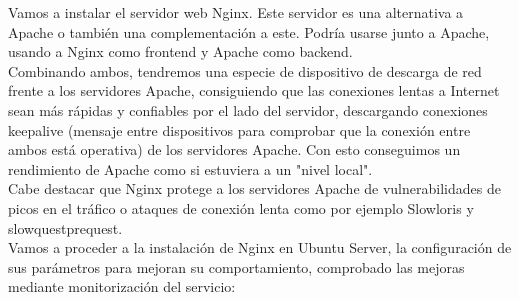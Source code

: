	
	Vamos a instalar el servidor web Nginx. Este servidor es una alternativa a Apache o también una complementación a este. Podría usarse junto a Apache, usando a Nginx como frontend y Apache como backend.\cite{ejercicio6-1,ejercicio6-2} \\
	Combinando ambos, tendremos una especie de dispositivo de descarga de red frente a los servidores Apache, consiguiendo que las conexiones lentas a Internet sean más rápidas y confiables por el lado del servidor, descargando conexiones keepalive (mensaje entre dispositivos para comprobar que la conexión entre ambos está operativa) de los servidores Apache. Con esto conseguimos un rendimiento de Apache como si estuviera a un "nivel local".\\
	
	Cabe destacar que Nginx protege a los servidores Apache de vulnerabilidades de picos en el tráfico o ataques de conexión lenta como por ejemplo Slowloris y slowquestprequest.\\
	
	Vamos a proceder a la instalación de Nginx en Ubuntu Server, la configuración de sus parámetros para mejoran su comportamiento, comprobado las mejoras mediante monitorización del servicio:
	
